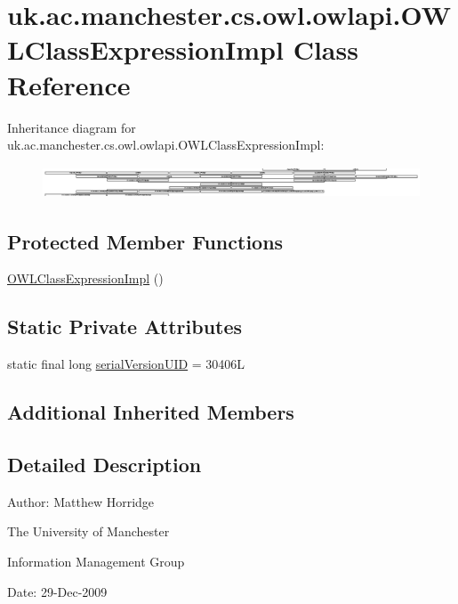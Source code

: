 \hypertarget{classuk_1_1ac_1_1manchester_1_1cs_1_1owl_1_1owlapi_1_1_o_w_l_class_expression_impl}{\section{uk.\-ac.\-manchester.\-cs.\-owl.\-owlapi.\-O\-W\-L\-Class\-Expression\-Impl Class Reference}
\label{classuk_1_1ac_1_1manchester_1_1cs_1_1owl_1_1owlapi_1_1_o_w_l_class_expression_impl}
}
Inheritance diagram for uk.\-ac.\-manchester.\-cs.\-owl.\-owlapi.\-O\-W\-L\-Class\-Expression\-Impl\-:\begin{figure}[H]
\begin{center}
\leavevmode
\includegraphics[height=0.949958cm]{classuk_1_1ac_1_1manchester_1_1cs_1_1owl_1_1owlapi_1_1_o_w_l_class_expression_impl}
\end{center}
\end{figure}
\subsection*{Protected Member Functions}
\begin{DoxyCompactItemize}
\item 
\hyperlink{classuk_1_1ac_1_1manchester_1_1cs_1_1owl_1_1owlapi_1_1_o_w_l_class_expression_impl_a97d7c9a1350e377f9f84711fd48914b3}{O\-W\-L\-Class\-Expression\-Impl} ()
\end{DoxyCompactItemize}
\subsection*{Static Private Attributes}
\begin{DoxyCompactItemize}
\item 
static final long \hyperlink{classuk_1_1ac_1_1manchester_1_1cs_1_1owl_1_1owlapi_1_1_o_w_l_class_expression_impl_adeba7735451930bc9fb2edc94f1284e3}{serial\-Version\-U\-I\-D} = 30406\-L
\end{DoxyCompactItemize}
\subsection*{Additional Inherited Members}


\subsection{Detailed Description}
Author\-: Matthew Horridge\par
 The University of Manchester\par
 Information Management Group\par
 Date\-: 29-\/\-Dec-\/2009 


